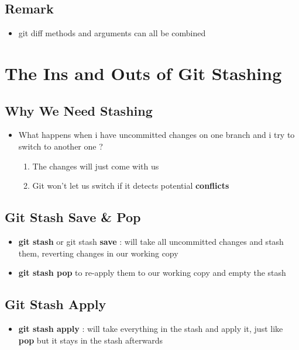 \documentclass{report}
\newcommand{\warning}{
	{\fontencoding{U}\fontfamily{futs}\selectfont\char 66\relax}
}
\begin{document}
\section{Remark}

\begin{itemize}
	\item \warning git diff methods and arguments can all be combined
\end{itemize}



\chapter{The Ins and Outs of Git Stashing}


\section{Why We Need Stashing}
\begin{itemize}
	\item What happens when i have uncommitted changes on one branch and i try to switch to another one ?
			\begin{enumerate}
				\item The changes will just come with us 
				\item Git won't let us switch if it detects potential \textbf{conflicts}
			\end{enumerate}
\end{itemize}


\section{Git Stash Save \& Pop}

\begin{itemize}
	\item \textbf{git stash} or git stash \textbf{save} : will take all uncommitted changes and stash them, reverting changes in our working copy 
	\item \textbf{git stash pop} to re-apply them to our working copy and empty the stash
\end{itemize}


\section{Git Stash Apply}

\begin{itemize}
	\item \textbf{git stash apply} : will take everything in the stash and apply it, just like \textbf{pop} but it stays in the stash afterwards
\end{itemize}
\end{document}
